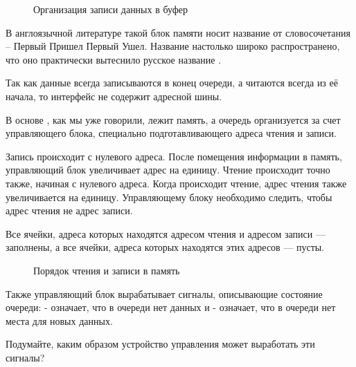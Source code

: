 \begin{figure}[H]
	\centering
	\def\svgwidth{\columnwidth}
	
	\caption{Организация записи данных в буфер}
\end{figure}

\par{В англоязычной литературе такой блок памяти носит название  от словосочетания  – Первый Пришел Первый Ушел. Название  настолько широко распространено, что оно практически вытеснило русское название .}

\par{Так как данные всегда записываются в конец очереди, а читаются всегда из её начала, то интерфейс  не содержит адресной шины.}

\vspace{4mm}

\par{В основе , как мы уже говорили, лежит  память, а очередь организуется за счет управляющего блока, специально подготавливающего адреса чтения и записи.}

\par{Запись происходит с нулевого адреса. После помещения информации в память, управляющий блок увеличивает адрес на единицу. Чтение происходит точно также, начиная с нулевого адреса. Когда происходит чтение, адрес чтения также увеличивается на единицу. Управляющему блоку необходимо следить, чтобы адрес чтения не  адрес записи.}

\par{Все ячейки, адреса которых находятся  адресом чтения и адресом записи — заполнены, а все ячейки, адреса которых находятся  этих адресов — пусты.}

\begin{figure}[H]
	\centering
	\def\svgwidth{\columnwidth}
	
	\caption{Порядок чтения и записи в память}
\end{figure}

\par{Также управляющий блок вырабатывает сигналы, описывающие состояние очереди:  - означает, что в очереди нет данных и  - означает, что в очереди нет места для новых данных.}

\par{Подумайте, каким образом устройство управления может выработать эти сигналы?}

